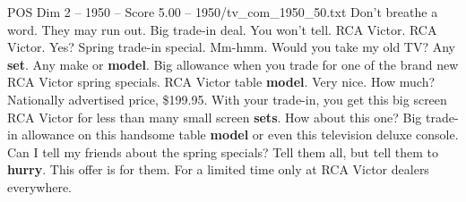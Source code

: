 \begin{textsample}{POS Dim 2 – 1950 – Score 5.00 – 1950/tv\_com\_1950\_50.txt}  \label{ex:f2_pos_007}
Don't breathe a word.
They may run out.
Big trade-in deal.
You won't tell.
RCA Victor.
RCA Victor.
Yes?
Spring trade-in special.
Mm-hmm.
Would you take my old TV?
Any \textbf{set}.
Any make or \textbf{model}.
Big allowance when you trade for one of the brand new RCA Victor spring specials.
RCA Victor table \textbf{model}.
Very nice.
How much?
Nationally advertised price, \$199.95.
With your trade-in, you get this big screen RCA Victor for less than many small screen \textbf{sets}.
How about this one?
Big trade-in allowance on this handsome table \textbf{model} or even this television deluxe console.
Can I tell my friends about the spring specials?
Tell them all, but tell them to \textbf{hurry}.
This offer is for them.
For a limited time only at RCA Victor dealers everywhere.

\end{textsample}
